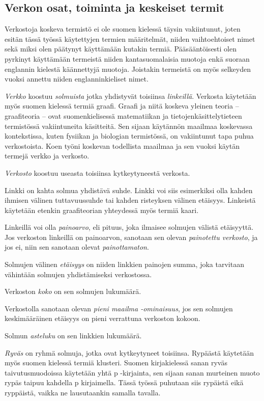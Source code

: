 \documentclass[finnish,12pt,a4paper,pdftex,elec,utf8]{aaltothesis}
\begin{document}
\subsection{Verkon osat, toiminta ja keskeiset termit}

Verkostoja koskeva termistö ei ole suomen kielessä täysin vakiintunut, joten esitän tässä työssä käytettyjen termien määritelmät, niiden vaihtoehtoiset nimet sekä miksi olen päätynyt käyttämään kutakin termiä. Pääsääntöisesti olen pyrkinyt käyttämään termeistä niiden kantasuomalaisia muotoja enkä suoraan englannin kielestä käännettyjä muotoja. Joistakin termeistä on myös selkeyden vuoksi annettu niiden englanninkieliset nimet.

\emph{Verkko} koostuu \emph{solmuista} jotka yhdistyvät toisiinsa \emph{linkeillä}. Verkosta käytetään myös suomen kielessä termiä graafi. Graafi ja niitä koskeva yleinen teoria – graafiteoria – ovat suomenkielisessä matematiikan ja tietojenkäsittelytieteen termistössä vakiintuneita käsitteitä. Sen sijaan käytännön maailmaa koskevassa kontekstissa, kuten fysiikan ja biologian termistössä, on vakiintunut tapa puhua verkostoista. Koen työni koskevan todellista maailmaa ja sen vuoksi käytän termejä verkko ja verkosto.

\emph{Verkosto} koostuu useasta toisiinsa kytkeytyneestä verkosta.

Linkki on kahta solmua yhdistävä suhde. Linkki voi siis esimerkiksi olla kahden ihmisen välinen tuttavuussuhde tai kahden risteyksen välinen etäisyys. Linkeistä käytetään etenkin graafiteorian yhteydessä myös termiä kaari.

Linkeillä voi olla \emph{painoarvo}, eli pituus, joka ilmaisee solmujen välistä etäisyyttä. Jos verkoston linkeillä on painoarvon, sanotaan sen olevan \emph{painotettu verkosto}, ja jos ei, niin sen sanotaan olevat \emph{painottamaton}.

Solmujen välinen \emph{etäisyys} on niiden linkkien painojen summa, joka tarvitaan vähintään solmujen yhdistämiseksi verkostossa.

Verkoston \emph{koko} on sen solmujen lukumäärä.

Verkostolla sanotaan olevan \emph{pieni maailma -ominaisuus}, jos sen solmujen keskimääräinen etäisyys on pieni verrattuna verkoston kokoon.

Solmun \emph{asteluku} on sen linkkien lukumäärä.

\emph{Ryväs} on ryhmä solmuja, jotka ovat kytkeytyneet toisiinsa. Rypäästä käytetään myös suomen kielessä termiä klusteri. \cite[54--55]{Linkit} Suomen kirjakielessä sanan ryväs taivutusmuodoissa käytetään yhtä p -kirjainta, sen sijaan sanan murteinen muoto rypäs taipuu kahdella p kirjaimella. Tässä työssä puhutaan siis rypäistä eikä ryppäistä, vaikka ne lausutaankin samalla tavalla. \cite{Rypas-rypaan}
\end{document}
